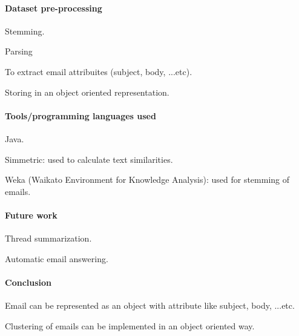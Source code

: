 \documentclass[12pt]{article}
\newenvironment{my_itemize}
{\begin{itemize}
  \setlength{\itemsep}{0cm}
  \setlength{\parskip}{0cm}}
{\end{itemize}}
\begin{document}
\paragraph{Dataset pre-processing}
\begin{my_itemize}
    \item Stemming.
    \item Parsing
    \begin{my_itemize}
        \item To extract email attribuites (subject, body, ...etc).
    \end{my_itemize}
    \item Storing in an object oriented representation.
\end{my_itemize}

\paragraph{Tools/programming languages used}
\begin{my_itemize}
    \item Java.
    \item Simmetric: used to calculate text similarities.
    \item Weka (Waikato Environment for Knowledge Analysis): used for stemming of emails.
\end{my_itemize}

\paragraph{Future work}
\begin{my_itemize}
    \item Thread summarization.
    \item Automatic email answering.
\end{my_itemize}

\paragraph{Conclusion}
\begin{my_itemize}
    \item Email can be represented as an object with attribute like subject, body, ...etc.
    \item Clustering of emails can be implemented in an object oriented way.
\end{my_itemize}


\end{document}
